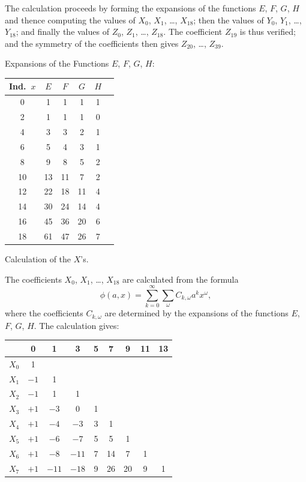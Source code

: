 \documentclass[11pt,a4paper]{book}
\begin{document}
\clearpage
The calculation proceeds by forming the expansions of the functions $E$, $F$, $G$, $H$ and thence computing the values of $X_0$, $X_1$, \dots, $X_{18}$; then the values of $Y_0$, $Y_1$, \dots, $Y_{18}$; and finally the values of $Z_0$, $Z_1$, \dots, $Z_{18}$. The coefficient $Z_{19}$ is thus verified; and the symmetry of the coefficients then gives $Z_{20}$, \dots, $Z_{39}$.

Expansions of the Functions $E$, $F$, $G$, $H$:

\begin{center}
\begin{tabular}{c|ccccc}
Ind.\ $x$ & $E$ & $F$ & $G$ & $H$ \\
\hline
0 & 1 & 1 & 1 & 1 \\
2 & 1 & 1 & 1 & 0 \\
4 & 3 & 3 & 2 & 1 \\
6 & 5 & 4 & 3 & 1 \\
8 & 9 & 8 & 5 & 2 \\
10 & 13 & 11 & 7 & 2 \\
12 & 22 & 18 & 11 & 4 \\
14 & 30 & 24 & 14 & 4 \\
16 & 45 & 36 & 20 & 6 \\
18 & 61 & 47 & 26 & 7
\end{tabular}
\end{center}

\clearpage
Calculation of the $X$'s.

The coefficients $X_0$, $X_1$, \dots, $X_{18}$ are calculated from the formula
\[
\phi(a, x) = \sum_{k=0}^{\infty} \sum_{\omega} C_{k,\omega} a^k x^{\omega},
\]
where the coefficients $C_{k,\omega}$ are determined by the expansions of the functions $E$, $F$, $G$, $H$. The calculation gives:

\begin{center}
\begin{tabular}{c|cccccccc}
& 0 & 1 & 3 & 5 & 7 & 9 & 11 & 13 \\
\hline
$X_0$ & 1 & & & & & & & \\
$X_1$ & $-1$ & 1 & & & & & & \\
$X_2$ & $-1$ & 1 & 1 & & & & & \\
$X_3$ & $+1$ & $-3$ & 0 & 1 & & & & \\
$X_4$ & $+1$ & $-4$ & $-3$ & 3 & 1 & & & \\
$X_5$ & $+1$ & $-6$ & $-7$ & 5 & 5 & 1 & & \\
$X_6$ & $+1$ & $-8$ & $-11$ & 7 & 14 & 7 & 1 & \\
$X_7$ & $+1$ & $-11$ & $-18$ & 9 & 26 & 20 & 9 & 1
\end{tabular}
\end{center}
\end{document}
